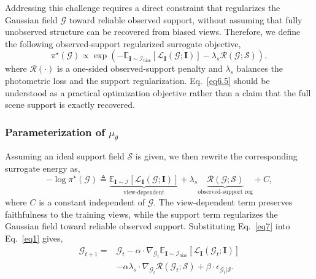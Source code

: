 \documentclass[lettersize,journal]{IEEEtran}
\begin{document}
Addressing this challenge requires a direct constraint that regularizes the Gaussian field $\mathcal{G}$ toward reliable observed support, without assuming that fully unobserved structure can be recovered from biased views.
Therefore, we define the following observed-support regularized surrogate objective,
\begin{equation}
    \pi^{\star} (\mathcal{G}) \propto \exp \left( - \mathbb{E}_{\mathbf{I}\sim\mathcal{I}_{\text{bias}}}\!\left[\mathcal{L}_{\mathbf{I}}(\mathcal{G};\mathbf{I})\right] - \lambda_{s} \mathcal{R}(\mathcal{G};\mathcal{S}) \right),
    \label{eq6.5}
\end{equation}
where $\mathcal{R}(\cdot)$ is a one-sided observed-support penalty and $\lambda_{s}$ balances the photometric loss and the support regularization. Eq.~\ref{eq6.5} should be understood as a practical optimization objective rather than a claim that the full scene support is exactly recovered.

\subsubsection{Parameterization of \texorpdfstring{$\mu_{\theta}$}{mu-theta}}

Assuming an ideal support field $\mathcal{S}$ is given, we then rewrite the corresponding surrogate energy as, 
\begin{equation}
    -\log \pi^{\star} (\mathcal{G}) \triangleq \underbrace{\mathbb{E}_{\mathbf{I}\sim\mathcal{I}}\!\left[\mathcal{L}_{\mathbf{I}}(\mathcal{G};\mathbf{I})\right]}_{\text{view-dependent}}
    + \lambda_{s} \underbrace{\mathcal{R}(\mathcal{G};\mathcal{S})}_{\text{observed-support reg}} + C,
    \label{eq7}
\end{equation}
where $C$ is a constant independent of $\mathcal{G}$. The view-dependent term preserves faithfulness to the training views, while the support term regularizes the Gaussian field toward reliable observed support. Substituting Eq.~\ref{eq7} into Eq.~\ref{eq1} gives, 
\begin{equation}
    \begin{aligned}
    \mathcal{G}_{t+1} = &\mathcal{G}_t - \alpha \cdot \nabla_{\mathcal{G}_t} \mathbb{E}_{\mathbf{I}\sim\mathcal{I}_{\text{bias}}}\!\left[\mathcal{L}_{\mathbf{I}}(\mathcal{G}_t;\mathbf{I})\right] \\
    &- \alpha \lambda_s \cdot \nabla_{\mathcal{G}_t} \mathcal{R}(\mathcal{G}_t;\mathcal{S}) + \beta \cdot \epsilon_{\mathcal{G}_t \vert \mathcal{S}}.
    \end{aligned}
    \label{eq8}
\end{equation} 
\end{document}
